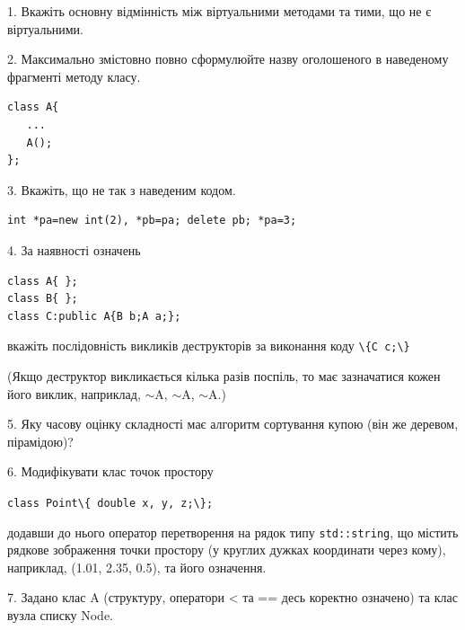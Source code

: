 \documentclass[12pt, ukrainian]{article}
\def\code#1{\Verb!#1!}
\begin{document}
{%
1. Вкажіть основну відмінність між віртуальними методами та тими, що не є віртуальними.%
\par
\vspace{2mm}
2. Максимально змістовно повно сформулюйте назву оголошеного в наведеному фрагменті методу класу.
\vspace{-3mm}
\begin{verbatim}class A{
   ...
   A();
};\end{verbatim}
\vspace{-3mm}
\par
\vspace{2mm}
3. Вкажіть, що не так з наведеним кодом.
\vspace{-3mm}
\begin{verbatim}int *pa=new int(2), *pb=pa; delete pb; *pa=3;\end{verbatim}
\vspace{-3mm}
\par
\vspace{2mm}
4. За наявності означень
\vspace{-3mm}
\begin{verbatim}
class A{ };
class B{ };
class C:public A{B b;A a;};\end{verbatim}
\vspace{-3mm}
вкажіть послідовність викликів деструкторів за виконання коду \code{\{C c;\}} 

(Якщо деструктор викликається кілька разів поспіль, то має зазначатися кожен його виклик, наприклад, $\sim$A, $\sim$A, $\sim$A.)

\vspace{2mm}
5. Яку часову оцінку складності має алгоритм сортування купою (він же деревом, пірамідою)?
\par
\vspace{2mm}
6. Модифікувати клас точок простору 

\qquad\code{class Point\{ double x, y, z;\};}


додавши до нього оператор перетворення на рядок типу \code{std::string}, що містить рядкове зображення точки простору (у круглих дужках координати через кому), наприклад, (1.01, 2.35, 0.5), та його означення.%
\par
\vspace{2mm}
7. 
Задано клас A (структуру, оператори < та == десь коректно означено) та клас вузла списку Node.

}
\end{document}
